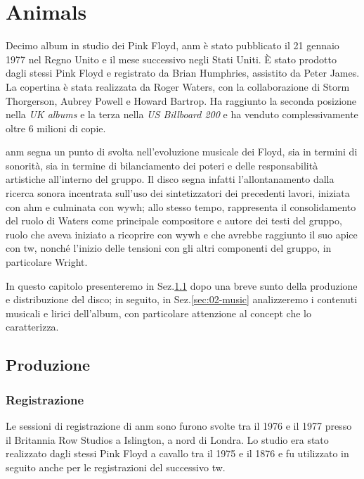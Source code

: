 \documentclass[class=book, crop=false, oneside, 12pt]{standalone}
\begin{document}
    \chapter{Animals}
    \label{ch:02-animals}
    Decimo album in studio dei Pink Floyd, \acrlong{anm} è stato pubblicato il 21 gennaio 1977 nel Regno Unito e il mese successivo negli Stati Uniti. È stato prodotto dagli stessi Pink Floyd e registrato da Brian Humphries, assistito da Peter James. La copertina è stata realizzata da Roger Waters, con la collaborazione di Storm Thorgerson, Aubrey Powell e Howard Bartrop. Ha raggiunto la seconda posizione nella \emph{UK albums} e la terza nella \emph{US Billboard 200} e ha venduto complessivamente oltre 6 milioni di copie.

    \acrshort{anm} segna un punto di svolta nell'evoluzione musicale dei Floyd, sia in termini di sonorità, sia in termine di bilanciamento dei poteri e delle responsabilità artistiche all'interno del gruppo. Il disco segna infatti l'allontanamento dalla ricerca sonora incentrata sull'uso dei sintetizzatori dei precedenti lavori, iniziata con \acrlong{ahm} e culminata con \acrlong {wywh}; allo stesso tempo, rappresenta il consolidamento del ruolo di Waters come principale compositore e autore dei testi del gruppo, ruolo che aveva iniziato a ricoprire con \acrshort{wywh} e che avrebbe raggiunto il suo apice con \acrlong{tw}, nonché l'inizio delle tensioni con gli altri componenti del gruppo, in particolare Wright.

    In questo capitolo presenteremo in Sez.\ref{sec:02-production} dopo una breve sunto della produzione e distribuzione del disco; in seguito, in Sez.\ref{sec:02-music} analizzeremo i contenuti musicali e lirici dell'album, con particolare attenzione al concept che lo caratterizza.

    \section{Produzione}\label{sec:02-production}
    \subsection{Registrazione}
    Le sessioni di registrazione di \acrshort{anm} sono furono svolte tra il 1976 e il 1977 presso il Britannia Row Studios a Islington, a nord di Londra. Lo studio era stato realizzato dagli stessi Pink Floyd a cavallo tra il 1975 e il 1876 e fu utilizzato in seguito anche per le registrazioni del successivo \acrlong{tw}. 
\end{document}

